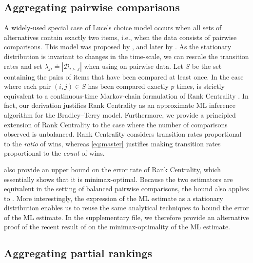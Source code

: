 \subsection{Aggregating pairwise comparisons}
\label{sec:pairwise}

A widely-used special case of Luce's choice model occurs when all sets of alternatives contain exactly two items, i.e., when the data consists of pairwise comparisons.
This model was proposed by \citet{zermelo1928berechnung}, and later by \citet{bradley1952rank}.
As the stationary distribution is invariant to changes in the time-scale, we can rescale the transition rates and set $\lambda_{ji} \doteq |\mathcal{D}_{i \succ j}|$ when using \LSR{} on pairwise data.
Let $S$ be the set containing the pairs of items that have been compared at least once.
In the case where each pair $(i, j) \in S$ has been compared exactly $p$ times, \LSR{} is strictly equivalent to a continuous-time Markov-chain formulation of Rank Centrality \citep{negahban2012iterative}.
In fact, our derivation justifies Rank Centrality as an approximate ML inference algorithm for the Bradley--Terry model.
Furthermore, we provide a principled extension of Rank Centrality to the case where the number of comparisons observed is unbalanced.
Rank Centrality considers transition rates proportional to the \emph{ratio} of wins, whereas \eqref{eq:master} justifies making transition rates proportional to the \emph{count} of wins.

\citet{negahban2012iterative} also provide an upper bound on the error rate of Rank Centrality, which essentially shows that it is minimax-optimal.
Because the two estimators are equivalent in the setting of balanced pairwise comparisons, the bound also applies to \LSR{}.
More interestingly, the expression of the ML estimate as a stationary distribution enables us to reuse the same analytical techniques to bound the error of the ML estimate.
In the supplementary file, we therefore provide an alternative proof of the recent result of \citet{hajek2014minimax} on the minimax-optimality of the ML estimate.

\subsection{Aggregating partial rankings}
\label{sec:partial}

